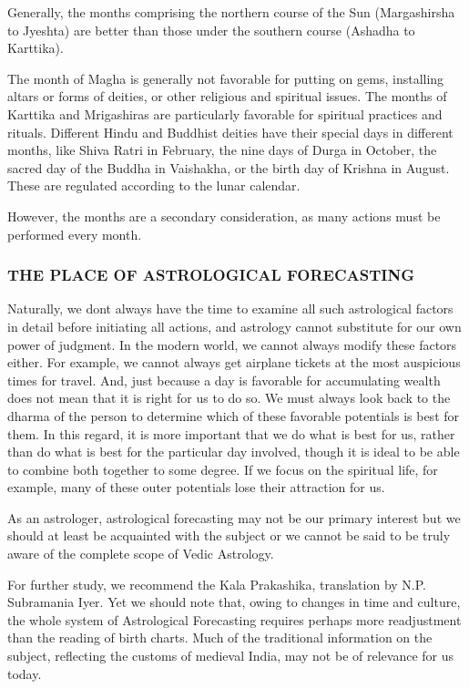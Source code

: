 \begin{enumerate}
\begin{enumerate}
 

Generally, the months comprising the northern course of the Sun (Margashirsha to Jyeshta) are better than those under the southern course (Ashadha to Karttika).

 

The month of Magha is generally not favorable for putting on gems, installing altars or forms of deities, or other religious and spiritual issues. The months of Karttika and Mrigashiras are particularly favorable for spiritual practices and rituals. Different Hindu and Buddhist deities have their special days in different months, like Shiva Ratri in February, the nine days of Durga in October, the sacred day of the Buddha in Vaishakha, or the birth day of Krishna in August. These are regulated according to the lunar calendar.

However, the months are a secondary consideration, as many actions must be performed every month.

 

\subsubsection{THE PLACE OF ASTROLOGICAL FORECASTING}

Naturally, we dont always have the time to examine all such astrological factors in detail before initiating all actions, and astrology cannot substitute for our own power of judgment. In the modern world, we cannot always modify these factors either. For example, we cannot always get airplane tickets at the most auspicious times for travel. And, just because a day is favorable for accumulating wealth does not mean that it is right for us to do so. We must always look back to the dharma of the person to determine which of these favorable potentials is best for them. In this regard, it is more important that we do what is best for us, rather than do what is best for the particular day involved, though it is ideal to be able to combine both together to some degree. If we focus on the spiritual life, for example, many of these outer potentials lose their attraction for us.

 

As an astrologer, astrological forecasting may not be our primary interest but we should at least be acquainted with the subject or we cannot be said to be truly aware of the complete scope of Vedic Astrology.

 

For further study, we recommend the Kala Prakashika, translation by N.P. Subramania Iyer. Yet we should note that, owing to changes in time and culture, the whole system of Astrological Forecasting requires perhaps more readjustment than the reading of birth charts. Much of the traditional information on the subject, reflecting the customs of medieval India, may not be of relevance for us today.


\end{enumerate}
\end{enumerate}
